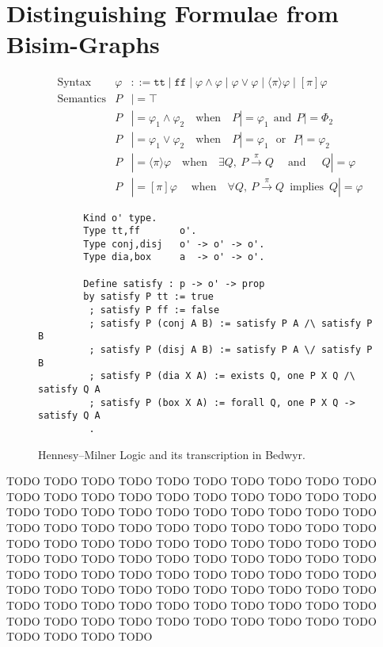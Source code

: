 \documentclass{llncs}
\begin{document}
\section{Distinguishing Formulae from Bisim-Graphs}\label{sec:ccsdf}

\begin{figure}
\begin{align*}
&\text{Syntax} &
\varphi & ::= \texttt{tt} \mid \texttt{ff}
    \mid \varphi \land \varphi \mid \varphi \lor \varphi
    \mid \langle\pi\rangle \varphi \mid [\pi] \varphi
\\
&\text{Semantics} &
  P & |= \top \\&&
  P & |= \varphi_1 \land \varphi_2 \quad\text{when}\quad P |= \varphi_1 ~~\text{and}~~ P |= \varPhi_2 \\&&
  P & |= \varphi_1 \lor \varphi_2 \quad\text{when}\quad P |= \varphi_1 ~~~\text{or}~~~ P |= \varphi_2 \\&&
  P & |= \langle \pi \rangle \varphi \quad\text{when}\quad \exists Q,~ P\xrightarrow{\pi} Q \;\quad\text{and}\quad\;\, Q |= \varphi \\&&
  P & |= [\pi] \varphi \;\quad\text{when}\quad \forall Q,~ P\xrightarrow{\pi} Q ~\;\text{implies}~\; Q |= \varphi
\end{align*}
\vspace*{-3ex}
\begin{lstlisting}
        Kind o' type.
        Type tt,ff       o'.
        Type conj,disj   o' -> o' -> o'.
        Type dia,box     a  -> o' -> o'.

        Define satisfy : p -> o' -> prop
        by satisfy P tt := true
         ; satisfy P ff := false
         ; satisfy P (conj A B) := satisfy P A /\ satisfy P B
         ; satisfy P (disj A B) := satisfy P A \/ satisfy P B
         ; satisfy P (dia X A) := exists Q, one P X Q /\ satisfy Q A
         ; satisfy P (box X A) := forall Q, one P X Q -> satisfy Q A
         .
\end{lstlisting}
\vspace*{-2ex}
\caption{Hennesy--Milner Logic and its transcription in Bedwyr.}
  \label{TODO}
\end{figure}

TODO TODO TODO TODO TODO TODO TODO TODO TODO TODO TODO TODO TODO
TODO TODO TODO TODO TODO TODO TODO TODO TODO TODO TODO TODO TODO
TODO TODO TODO TODO TODO TODO TODO TODO TODO TODO TODO TODO TODO
TODO TODO TODO TODO TODO TODO TODO TODO TODO TODO TODO TODO TODO
TODO TODO TODO TODO TODO TODO TODO TODO TODO TODO TODO TODO TODO
TODO TODO TODO TODO TODO TODO TODO TODO TODO TODO TODO TODO TODO
TODO TODO TODO TODO TODO TODO TODO TODO TODO TODO TODO TODO TODO
TODO TODO TODO TODO TODO TODO TODO TODO TODO TODO TODO TODO TODO
\end{document}
